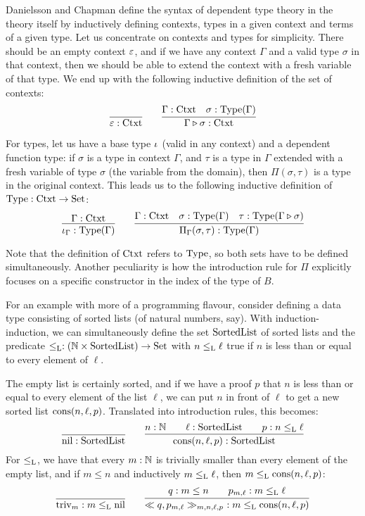 \documentclass[orivec,envcountsame, ,envcountsect]{llncs}
\begin{document}
Danielsson \cite{danielsson2007formalisation} and Chapman
\cite{chapman2009eatitself} define the syntax of dependent type theory
in the theory itself by inductively defining contexts, types in a
given context and terms of a given type. Let us concentrate on
contexts and types for simplicity. There should be an empty
context $\varepsilon$, and if we have any context $\Gamma$ and a valid
type $\sigma$ in that context, then we should be able to extend the
context with a fresh variable of that type. We end up with the
following inductive definition of the set of contexts:
\[
\infer{\emptyCtxt : \Ctxt}{} \qquad
\infer{\consCtxt{\Gamma}{\sigma} : \Ctxt}{\Gamma : \Ctxt & \sigma : \Type(\Gamma)}
\]

For types, let us have a base type $\iota_{}$ (valid in any context)
and a dependent function type: if $\sigma$ is a type in context $\Gamma$,
and $\tau$ is a type in $\Gamma$ extended with a fresh variable of type
$\sigma$ (the variable from the domain), then $\Pi(\sigma, \tau)$ is a
type in the original context. This leads us to the following inductive
definition of $\text{Type} : \text{Ctxt} \to \text{Set}$:
\[
\infer{\baseTy{\Gamma} : \Type(\Gamma)}{\Gamma : \Ctxt} \qquad
\infer{\piTy{\Gamma}{\sigma}{\tau} : \Type(\Gamma)}{\Gamma : \Ctxt
                    & \sigma : \Type(\Gamma)
                    & \tau : \Type(\consCtxt{\Gamma}{\sigma})}
\]

Note that the definition of $\text{Ctxt}$ refers to $\text{Type}$, so both sets
have to be defined simultaneously. Another peculiarity is how the
introduction rule for $\Pi$ explicitly focuses on a specific
constructor in the index of the type of $B$.

For an example with more of a programming flavour, consider defining a
data type consisting of sorted lists (of natural numbers, say). With
induction-induction, we can simultaneously define the set
$\text{SortedList}$ of sorted lists and the predicate $\leq_{\text{L}} : (\mathbb{N}
\times \text{SortedList}) \to \text{Set}$ with $n \leq_{\text{L}} \ell$ true if $n$ is
less than or equal to every element of $\ell$.

The empty list is certainly sorted, and if we have a proof $p$ that
$n$ is less than or equal to every element of the list $\ell$, we can
put $n$ in front of $\ell$ to get a new sorted list
$\text{cons}(n, \ell, p)$. Translated into introduction rules, this becomes:
\[
\infer{\nilList : \SortedList}{} \qquad
\infer{\consList{n}{\ell}{p} : \SortedList}{n : \Nat \quad & \ell : \SortedList \quad & p : n \lessList \ell}
\]
For $\leq_{\text{L}}$, we have that every $m : \mathbb{N}$ is trivially smaller
than every element of the empty list, and if $m \leq n$ and
inductively $m \leq_{\text{L}} \ell$, then $m \leq_{\text{L}} \text{cons}(n, \ell, p)$:
\[
\infer{\nilLess{m} : m \lessList \nilList}
{} \qquad
\infer{\consLess{n}{\ell}{p}{m}{q}{p_{m, \ell}}\ : m \lessList \consList{n}{\ell}{p}}
       {q : m \leq n \quad & p_{m, \ell} : m \lessList \ell}
\]
\end{document}
